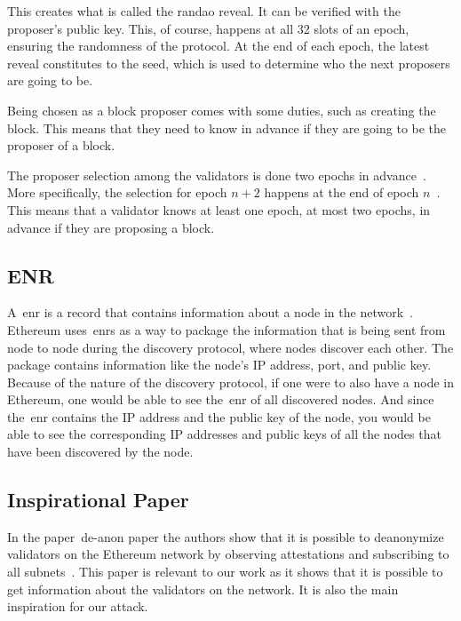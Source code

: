This creates what is called the \gls{randao} reveal.
It can be verified with the proposer's public key.
This, of course, happens at all 32 slots of an epoch, ensuring the randomness of the protocol.
At the end of each epoch, the latest reveal constitutes to the seed, which is used to determine who the next proposers are going to be.


Being chosen as a block proposer comes with some duties, such as creating the block.
This means that they need to know in advance if they are going to be the proposer of a block.

The proposer selection among the validators is done two epochs in advance~\cite{random-selection}.
More specifically, the selection for epoch $n+2$ happens at the end of epoch $n$~\cite{upgrading-ethereum-randomness}.
This means that a validator knows at least one epoch, at most two epochs, in advance if they are proposing a block.


\subsection{ENR}\label{subsec:enr}
A~\gls{enr} is a record that contains information about a node in the network~\cite{EIP-778:Ethereum-Node-Records}.
Ethereum uses~\glspl{enr} as a way
to package the information that is being sent from node to node during the discovery protocol,
where nodes discover each other.
The package contains information like the node's IP address, port, and public key.
Because of the nature of the discovery protocol, if one were to also have a node in Ethereum,
one would be able to see the~\gls{enr} of all discovered nodes.
And since the~\gls{enr} contains the IP address and the public key of the node,
you would be able
to see the corresponding IP addresses and public keys of all the nodes that have been discovered by the node.


\subsection{Inspirational Paper}\label{subsec:inspirational-papers}

In the paper~\gls{de-anon paper} the authors show that it is possible to deanonymize validators on the Ethereum network by observing attestations and subscribing to all subnets~\cite{heimbach2024deanonymizingethereumvalidatorsp2p}.
This paper is relevant to our work as it shows that it is possible to get information about the validators on the network.
It is also the main inspiration for our attack.


